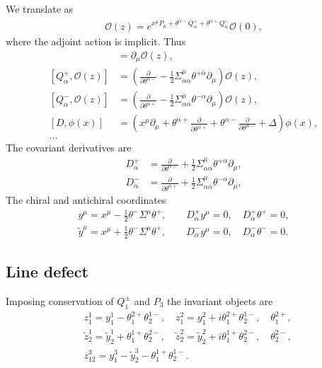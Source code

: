 \documentclass[letterpaper]{article}
\let\Oldsubsection\subsection
\renewcommand{\subsection}{\FloatBarrier\Oldsubsection}
\def\Om{{\mathcal{O}}}
\def\a{{\alpha}}
\def\ad{{\dot{\alpha}}}
\begin{document}
We translate as
\begin{align}
 \Om(z) = e^{x^\mu P_\mu + \theta^{\a-} Q^+_\a + \theta^{\ad+} Q^-_\ad} \Om(0),
\end{align}
where the adjoint action is implicit. Thus
\begin{align}
 [P_\mu, \Om(z)] & = \partial_\mu \Om(z), \\
 [Q^+_\a, \Om(z)] & = \left( 
     \frac{\partial}{\partial \theta^{\a-}} 
   - \frac{1}{2} \Sigma^\mu_{\a\ad} \theta^{+\ad} \partial_\mu
 \right) \Om(z), \\
 [Q^-_\ad, \Om(z)] & = \left( 
     \frac{\partial}{\partial \theta^{\ad+}} 
   - \frac{1}{2} \Sigma^\mu_{\a\ad} \theta^{-\a} \partial_\mu
 \right) \Om(z), \\
 [D, \phi(x)] & =  \left(
      x^\mu \partial_\mu 
    + \theta^{\ad+} \frac{\partial}{\partial \theta^{\ad+}} 
    + \theta^{\a-}  \frac{\partial}{\partial \theta^{\a-}} 
    + \Delta
  \right) \phi(x), \\
 \ldots
\end{align}
The covariant derivatives are
\begin{align}
   D^+_\a 
 & = \frac{\partial}{\partial \theta^{\a-}} 
   + \frac{1}{2} \Sigma^\mu_{\a\ad} \theta^{+\ad} \partial_\mu, \\
   D^-_\ad
 & = \frac{\partial}{\partial \theta^{\ad+}} 
   + \frac{1}{2} \Sigma^\mu_{\a\ad} \theta^{-\a} \partial_\mu,
\end{align}
The chiral and antichiral coordinates
\begin{align}
 y^\mu = x^\mu - \frac{1}{2} \theta^- \Sigma^\mu \theta^+, \qquad
 D^+_\a y^\mu = 0, \quad
 D^+_\a \theta^+ = 0, \\
 \tilde y^\mu = x^\mu + \frac{1}{2} \theta^- \Sigma^\mu \theta^+, \qquad
 D^-_\a y^\mu = 0, \quad
 D^-_\a \theta^- = 0.
\end{align}

\subsection{Line defect}

Imposing conservation of $Q_{1}^\pm$ and $P_3$ the invariant objects are
\begin{align}
 & z_1^1 = y_1^1 -   \theta_1^{2+} \theta_2^{1-}, \quad
   z_1^2 = y_1^2 + i \theta_1^{2+} \theta_2^{1-}, \quad
   \theta_1^{2+}, \\[0.5em]
 & \tilde z_2^1 = \tilde y_2^1 +   \theta_1^{1+} \theta_2^{2-}, \quad
   \tilde z_2^2 = \tilde y_2^2 + i \theta_1^{1+} \theta_2^{2-}, \quad
   \theta_2^{2-}, \\[0.5em]
 & z_{12}^3 = y_1^3 - \tilde y_2^3 - \theta_1^{1+} \theta_2^{1-}.
\end{align}
\end{document}
